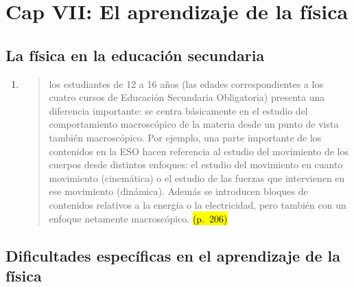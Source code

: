 \documentclass{article}
\begin{document}
\tableofcontents  \vspace{2cm}


\section*{\textcolor{Sun}{ \textbf{ \textcolor{Mantle}{\textbf{Cap VII:}} El aprendizaje de la física}}}


\subsection*{La física en la educación secundaria}

\begin{enumerate}
  \setcounter{enumi}{0}
\item
\begin{quote}
los estudiantes de 12 a 16 años (las edades correspondientes a los cuatro cursos de Educación Secundaria Obligatoria) presenta una diferencia importante: se centra básicamente en el estudio del comportamiento macroscópico de la materia desde un punto de vista también macroscópico. Por ejemplo, una parte importante de los contenidos en la ESO hacen referencia al estudio del movimiento de los cuerpos desde distintos enfoques: el estudio del movimiento en cuanto movimiento (cinemática) o el estudio de las fuerzas que intervienen en ese movimiento (dinámica). Además se introducen bloques de contenidos relativos a la energía o la electricidad, pero también con un enfoque netamente macroscópico. \hl{(p.~206)}
\end{quote}
\end{enumerate}



\subsection*{Dificultades específicas en el aprendizaje de la física}
\end{document}
